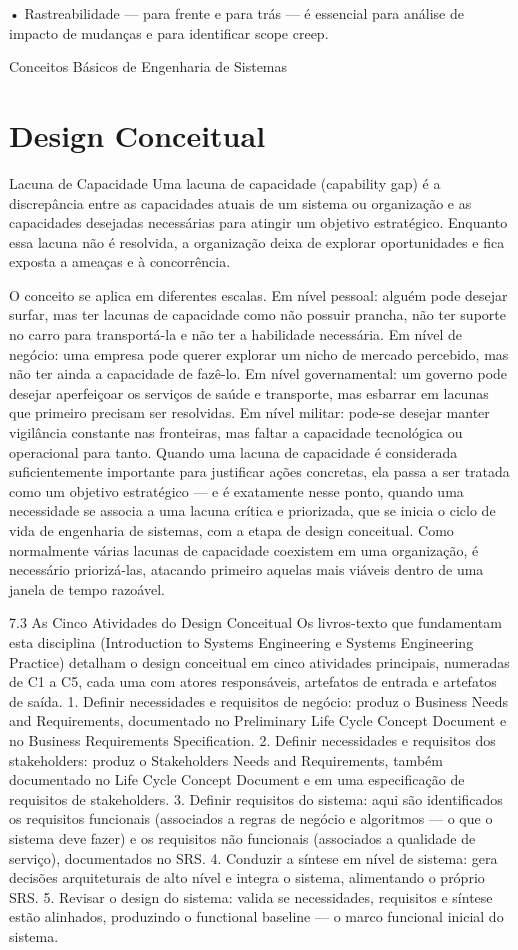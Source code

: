 • Rastreabilidade — para frente e para trás — é essencial para análise de impacto de mudanças e para identificar scope creep.

Conceitos Básicos de Engenharia de Sistemas

\chapter{Design Conceitual}

Lacuna de Capacidade Uma lacuna de capacidade (capability gap) é a discrepância entre as capacidades atuais de um sistema ou organização e as capacidades desejadas necessárias para atingir um objetivo estratégico. Enquanto essa lacuna não é resolvida, a organização deixa de explorar oportunidades e fica exposta a ameaças e à concorrência.

O conceito se aplica em diferentes escalas. Em nível pessoal: alguém pode desejar surfar, mas ter lacunas de capacidade como não possuir prancha, não ter suporte no carro para transportá-la e não ter a habilidade necessária. Em nível de negócio: uma empresa pode querer explorar um nicho de mercado percebido, mas não ter ainda a capacidade de fazê-lo. Em nível governamental: um governo pode desejar aperfeiçoar os serviços de saúde e transporte, mas esbarrar em lacunas que primeiro precisam ser resolvidas. Em nível militar: pode-se desejar manter vigilância constante nas fronteiras, mas faltar a capacidade tecnológica ou operacional para tanto. Quando uma lacuna de capacidade é considerada suficientemente importante para justificar ações concretas, ela passa a ser tratada como um objetivo estratégico — e é exatamente nesse ponto, quando uma necessidade se associa a uma lacuna crítica e priorizada, que se inicia o ciclo de vida de engenharia de sistemas, com a etapa de design conceitual. Como normalmente várias lacunas de capacidade coexistem em uma organização, é necessário priorizá-las, atacando primeiro aquelas mais viáveis dentro de uma janela de tempo razoável.

7.3 As Cinco Atividades do Design Conceitual Os livros-texto que fundamentam esta disciplina (Introduction to Systems Engineering e Systems Engineering Practice) detalham o design conceitual em cinco atividades principais, numeradas de C1 a C5, cada uma com atores responsáveis, artefatos de entrada e artefatos de saída. 1. Definir necessidades e requisitos de negócio: produz o Business Needs and Requirements, documentado no Preliminary Life Cycle Concept Document e no Business Requirements Specification. 2. Definir necessidades e requisitos dos stakeholders: produz o Stakeholders Needs and Requirements, também documentado no Life Cycle Concept Document e em uma especificação de requisitos de stakeholders. 3. Definir requisitos do sistema: aqui são identificados os requisitos funcionais (associados a regras de negócio e algoritmos — o que o sistema deve fazer) e os requisitos não funcionais (associados a qualidade de serviço), documentados no SRS. 4. Conduzir a síntese em nível de sistema: gera decisões arquiteturais de alto nível e integra o sistema, alimentando o próprio SRS. 5. Revisar o design do sistema: valida se necessidades, requisitos e síntese estão alinhados, produzindo o functional baseline — o marco funcional inicial do sistema.

